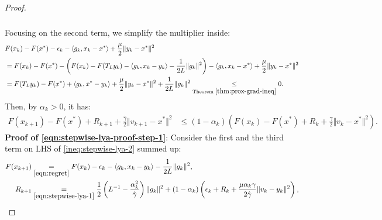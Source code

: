 \documentclass[12pt]{article}
\begin{document}
\begin{proof}
\begin{align}
\begin{split}
            \end{split}
        \end{align}
        Focusing on the second term, we simplify the multiplier inside:
        {\small
        \begin{align}
        \begin{split}\label{ineq:stepwise-lya-proof-ineq4}
            & F(x_k) - F(x^*) - \epsilon_k - \langle g_k, x_k - x^*\rangle + \frac{\mu}{2}\Vert y_k - x^*\Vert^2
            \\
            &=
            F(x_k) - F(x^*) - \left(
                F(x_k) - F(T_L y_k) - \langle g_k, x_k - y_k\rangle - \frac{1}{2L}\Vert g_k\Vert^2
            \right)- \langle g_k, x_k - x^*\rangle + \frac{\mu}{2}\Vert y_k - x^*\Vert^2
            \\
            &= F(T_L y_k) - F(x^*) + \langle g_k, x^* - y_k\rangle + \frac{\mu}{2}\Vert y_k - x^*\Vert^2
            + \frac{1}{2L}\Vert g_k\Vert^2 \underset{\text{Theorem }\ref{thm:prox-grad-ineq}}{\le} 0.
        \end{split}
        \end{align}
        }
        Then, by $\alpha_k > 0$, it has:
        {\small
        \begin{align*}
            F(x_{k + 1}) - F(x^*) + R_{k + 1} +
            \frac{\hat \gamma}{2}\Vert v_{k + 1} - x^*\Vert^2
            &\le
            (1 - \alpha_k)\left(
                F(x_k) - F(x^*) + R_k + \frac{\gamma}{2}\Vert v_k - x^*\Vert^2
            \right).
        \end{align*}
        } %
        \textbf{Proof of \eqref{eqn:stepwise-lya-proof-step-1}}:
        Consider the first and the third term on LHS of \eqref{ineq:stepwise-lya-2} summed up:
        \begin{align}\label{eqn:stepwise-lya-proof-eqn1}
            F(x_{k + 1}) &\underset{\eqref{eqn:regret}}{=}
            F(x_k) - \epsilon_k - \langle  g_k, x_k - y_k\rangle - \frac{1}{2L}\Vert g_k\Vert^2,
            \notag
            \\
            R_{k + 1}
            &\underset{\eqref{eqn:stepwise-lya-1}}{=}
            \frac{1}{2}\left(
                L^{-1} - \frac{\alpha_k^2}{\hat \gamma}
            \right)\Vert g_k\Vert^2
            +
            (1 - \alpha_k)
            \left(
                \epsilon_k + R_k +
                \frac{\mu\alpha_k\gamma}{2\hat \gamma}
                \Vert v_k - y_k\Vert^2
            \right),

\end{align}
\end{proof}
\end{document}
